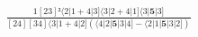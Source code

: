 \documentclass[varwidth, border=5pt]{standalone}
\begin{document}
\begin{my}
$\begin{gathered}
\scriptscriptstyle\frac{1[23]²⟨2|1+4|3]⟨3|2+4|1]⟨3|𝟓|3]}{[24][34]⟨3|1+4|2](⟨4|2|𝟓|3|4]-⟨2|1|𝟓|3|2])}
\end{gathered}$
\end{my}
\end{document}
